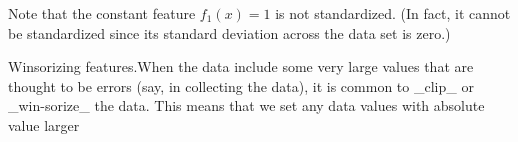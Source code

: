 Note that the constant feature \(f_{1}(x)=1\) is not standardized. (In fact, it cannot be standardized since its standard deviation across the data set is zero.)

Winsorizing features.When the data include some very large values that are thought to be errors (say, in collecting the data), it is common to _clip_ or _win-sorize_ the data. This means that we set any data values with absolute value larger